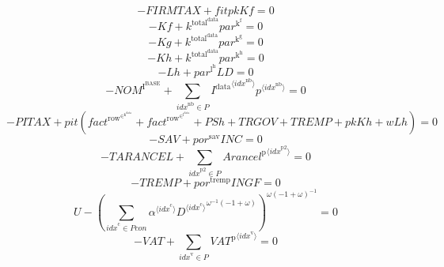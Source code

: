 \begin{equation}
-{F\!I\!R\!M\!T\!A\!X} + {{f\!i\!t}} {{p\!k}} {{K\!f}} = 0
\end{equation}
\begin{equation}
-{K\!f} + {k^{\mathrm{total}^{\mathrm{data}}}} {{p\!a\!r}^{\mathrm{k}^{\mathrm{f}}}} = 0
\end{equation}
\begin{equation}
-{K\!g} + {k^{\mathrm{total}^{\mathrm{data}}}} {{p\!a\!r}^{\mathrm{k}^{\mathrm{g}}}} = 0
\end{equation}
\begin{equation}
-{K\!h} + {k^{\mathrm{total}^{\mathrm{data}}}} {{p\!a\!r}^{\mathrm{k}^{\mathrm{h}}}} = 0
\end{equation}
\begin{equation}
-{L\!h} + {{p\!a\!r}^{\mathrm{l}^{\mathrm{h}}}} {{L\!D}} = 0
\end{equation}
\begin{equation}
-{N\!O\!M}^{\mathrm{I}^{\mathrm{BASE}}} + \sum_{{i\!d\!x}^{\mathrm{nb}}\in P} {{I^{\mathrm{data}}}^{\langle {i\!d\!x}^{\mathrm{nb}}\rangle}} {{p}^{\langle {i\!d\!x}^{\mathrm{nb}}\rangle}} = 0
\end{equation}
\begin{equation}
-{P\!I\!T\!A\!X} + {{p\!i\!t}} \left({f\!a\!c\!t}^{\mathrm{row}^{\in^{\mathrm{k}^{\mathrm{data}}}}} + {f\!a\!c\!t}^{\mathrm{row}^{\in^{\mathrm{l}^{\mathrm{data}}}}} + {P\!S\!h} + {T\!R\!G\!O\!V} + {T\!R\!E\!M\!P} + {{p\!k}} {{K\!h}} + {w} {{L\!h}}\right) = 0
\end{equation}
\begin{equation}
-{S\!A\!V} + {{p\!o\!r}^{\mathrm{sav}}} {{I\!N\!C}} = 0
\end{equation}
\begin{equation}
-{T\!A\!R\!A\!N\!C\!E\!L} + \sum_{{i\!d\!x}^{\mathrm{p2}}\in P} {{A\!r\!a\!n\!c\!e\!l}^{\mathrm{p}}}^{\langle {i\!d\!x}^{\mathrm{p2}}\rangle} = 0
\end{equation}
\begin{equation}
-{T\!R\!E\!M\!P} + {{p\!o\!r}^{\mathrm{tremp}}} {{I\!N\!G\!F}} = 0
\end{equation}
\begin{equation}
U - \left(\sum_{{i\!d\!x}^{\mathrm{c}}\in {P\!c\!o\!n}} {{\alpha}^{\langle {i\!d\!x}^{\mathrm{c}}\rangle}} {{{D}^{\langle {i\!d\!x}^{\mathrm{c}}\rangle}}^{{\omega}^{-1} \left(-1 + \omega\right)}}\right)^{{\omega} \left(-1 + \omega\right)^{-1}} = 0
\end{equation}
\begin{equation}
-{V\!A\!T} + \sum_{{i\!d\!x}^{\mathrm{v}}\in P} {{V\!A\!T}^{\mathrm{p}}}^{\langle {i\!d\!x}^{\mathrm{v}}\rangle} = 0
\end{equation}
